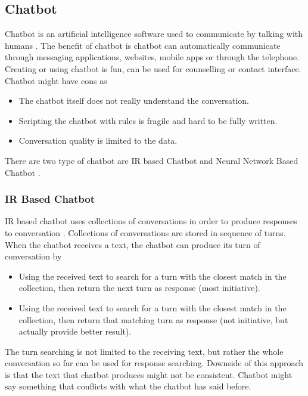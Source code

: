 \documentclass[12pt,oneside,openright,a4paper]{cpe-english-project}
\begin{document}
\subsection{Chatbot}
Chatbot is an artificial intelligence software used to communicate by talking with humans \cite{what_is_chatbot}.
The benefit of chatbot is chatbot can automatically communicate through messaging applications, websites, mobile apps
or through the telephone. Creating or using chatbot is fun, can be used for counselling or contact interface.\\
Chatbot might have cons as
\begin{itemize}
  \item The chatbot itself does not really understand the conversation.
  \item Scripting the chatbot with rules is fragile and hard to be fully written.
  \item Conversation quality is limited to the data.
\end{itemize}
There are two type of chatbot are IR based Chatbot and Neural Network Based Chatbot \cite{what_is_chatbot,five_types_of_chatbot}.

\subsubsection{IR Based Chatbot}
IR based chatbot uses collections of conversations in order to produce responses to conversation \cite{five_types_of_chatbot,rule_based_vs_nlp}.
Collections of conversations are stored in sequence of turns. When the chatbot receives a text,
the chatbot can produce its turn of conversation by
\begin{itemize}
  \item Using the received text to search for a turn with the closest match in the collection,
  then return the next turn as response (most initiative).
  \item Using the received text to search for a turn with the closest match in the collection,
  then return that matching turn as response (not initiative, but actually provide better result).
\end{itemize}
The turn searching is not limited to the receiving text, but rather the whole conversation so far
can be used for response searching. Downside of this approach is that the text that chatbot produces
might not be consistent. Chatbot might say something that conflicts with what the chatbot has said
before.
\end{document}
